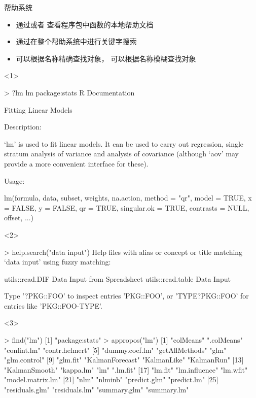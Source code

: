 \documentclass{beamerthemeMono}
\begin{document}
\begin{frame}[t,fragile]{\subsecname}{帮助系统}
\begin{itemize}
\item<1-> 通过或者
               查看程序包中函数的本地帮助文档
\item<2-> 通过在整个帮助系统中进行关键字搜索
\item<3-> 可以根据名称精确查找对象，
               可以根据名称模糊查找对象
\end{itemize}

\begin{overlayarea}{\textwidth}{\textheight}
\begin{onlyenv}<1>
\begin{rcode}
> ?lm
lm               package:stats            R Documentation

Fitting Linear Models

Description:

     ‘lm’ is used to fit linear models.  It can be used to carry out regression, single stratum analysis of variance and analysis of covariance (although ‘aov’ may provide a more convenient interface for these).

Usage:

     lm(formula, data, subset, weights, na.action, method = "qr", model = TRUE, x = FALSE, y = FALSE, qr = TRUE, singular.ok = TRUE, contrasts = NULL, offset, ...)
\end{rcode}
\end{onlyenv}

\begin{onlyenv}<2>
\begin{rcode}
> help.search("data input")
Help files with alias or concept or title matching ‘data input’ using fuzzy matching:


utils::read.DIF         Data Input from Spreadsheet
utils::read.table       Data Input


Type '?PKG::FOO' to inspect entries 'PKG::FOO', or 'TYPE?PKG::FOO' for entries like 'PKG::FOO-TYPE'.
\end{rcode}
\end{onlyenv}

\begin{onlyenv}<3>
\begin{rcode}
> find("lm")
[1] "package:stats"
> appropos("lm")
 [1] "colMeans"        ".colMeans"       "confint.lm"      "contr.helmert"  
 [5] "dummy.coef.lm"   "getAllMethods"   "glm"             "glm.control"    
 [9] "glm.fit"         "KalmanForecast"  "KalmanLike"      "KalmanRun"      
[13] "KalmanSmooth"    "kappa.lm"        "lm"              ".lm.fit"        
[17] "lm.fit"          "lm.influence"    "lm.wfit"         "model.matrix.lm"
[21] "nlm"             "nlminb"          "predict.glm"     "predict.lm"     
[25] "residuals.glm"   "residuals.lm"    "summary.glm"     "summary.lm" 
\end{rcode}
\end{onlyenv}

\end{overlayarea}
\end{frame}
\end{document}
